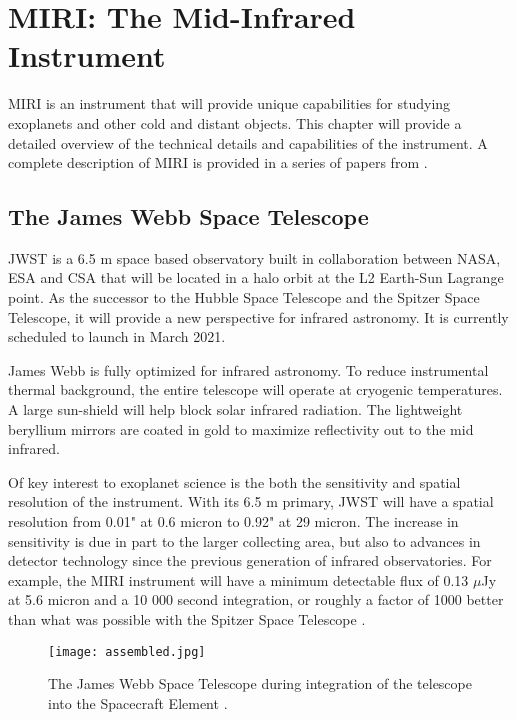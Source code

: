 \chapter{MIRI: The Mid-Infrared Instrument}
MIRI is an instrument that will provide unique capabilities for studying exoplanets and other cold and distant objects. This chapter will provide a detailed overview of the technical details and capabilities of the instrument. A complete description of MIRI is provided in a series of papers from \parencite{MIRI1,MIRI2,MIRI3, MIRI4,MIRI5,MIRI6,MIRI7,MIRI8,MIRI9}.
%
%
\section{The James Webb Space Telescope}
JWST is a 6.5 m space based observatory built in collaboration between NASA, ESA and CSA that will be located in a halo orbit at the L2 Earth-Sun Lagrange point. 
As the successor to the Hubble Space Telescope and the Spitzer Space Telescope, it will provide a new perspective for infrared astronomy. 
It is currently scheduled to launch in March 2021.

James Webb is fully optimized for infrared astronomy. 
To reduce instrumental thermal background, the entire telescope will operate at cryogenic temperatures. 
A large sun-shield will help block solar infrared radiation.
The lightweight beryllium mirrors are coated in gold to maximize reflectivity out to the mid infrared.

Of key interest to exoplanet science is the both the sensitivity and spatial resolution of the instrument. 
With its 6.5 m primary, JWST will have a spatial resolution from 0.01" at 0.6 micron to 0.92" at 29 micron.
The increase in sensitivity is due in part to the larger collecting area, but also to advances in detector technology since the previous generation of infrared observatories.
For example, the MIRI instrument will have a minimum detectable flux of 0.13 $\mu$Jy at 5.6 micron and a 10 000 second integration, or roughly a factor of 1000 better than what was possible with the Spitzer Space Telescope \parencite{MIRI9}.
\begin{figure}[t]
	\texttt{[image: assembled.jpg]}
	\caption{The James Webb Space Telescope during integration of the telescope into the Spacecraft Element \parencite{assembled}. }
	\label{fig:jwst}
\end{figure}

